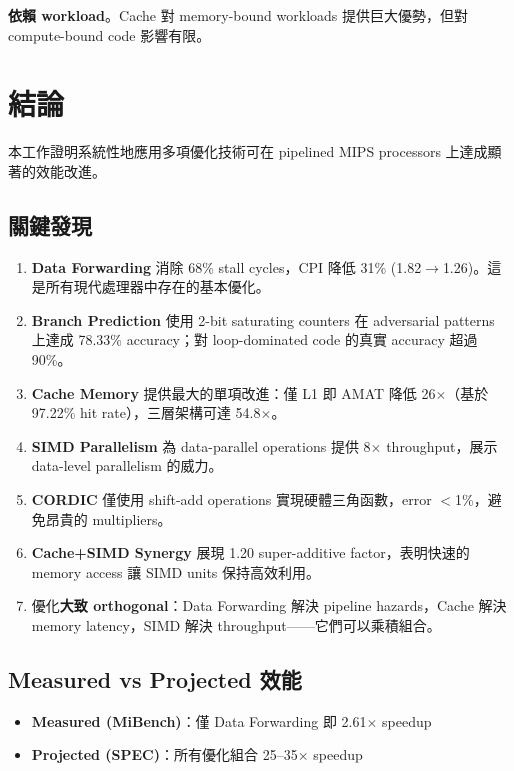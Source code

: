 \documentclass[journal]{IEEEtran}
\newcommand{\tagit}[1]{\textit{#1}}
\newcommand{\Insight}{\tagit{關鍵洞察：}}
\begin{document}
\textbf{依賴 workload}。Cache 對 memory-bound workloads 提供巨大優勢，但對 compute-bound code 影響有限。

\section{結論}

本工作證明系統性地應用多項優化技術可在 pipelined MIPS processors 上達成顯著的效能改進。

\subsection{關鍵發現}
\begin{enumerate}
\item \textbf{Data Forwarding} 消除 68\% stall cycles，CPI 降低 31\% (1.82$\rightarrow$1.26)。這是所有現代處理器中存在的基本優化。

\item \textbf{Branch Prediction} 使用 2-bit saturating counters 在 adversarial patterns 上達成 78.33\% accuracy；對 loop-dominated code 的真實 accuracy 超過 90\%。

\item \textbf{Cache Memory} 提供最大的單項改進：僅 L1 即 AMAT 降低 26$\times$（基於 97.22\% hit rate），三層架構可達 54.8$\times$。

\item \textbf{SIMD Parallelism} 為 data-parallel operations 提供 8$\times$ throughput，展示 data-level parallelism 的威力。

\item \textbf{CORDIC} 僅使用 shift-add operations 實現硬體三角函數，error $<$1\%，避免昂貴的 multipliers。

\item \textbf{Cache+SIMD Synergy} 展現 1.20 super-additive factor，表明快速的 memory access 讓 SIMD units 保持高效利用。

\item 優化\textbf{大致 orthogonal}：Data Forwarding 解決 pipeline hazards，Cache 解決 memory latency，SIMD 解決 throughput——它們可以乘積組合。
\end{enumerate}

\subsection{Measured vs Projected 效能}
\begin{itemize}
    \item \textbf{Measured (MiBench)}：僅 Data Forwarding 即 2.61$\times$ speedup
    \item \textbf{Projected (SPEC)}：所有優化組合 25--35$\times$ speedup
\end{itemize}
\end{document}
